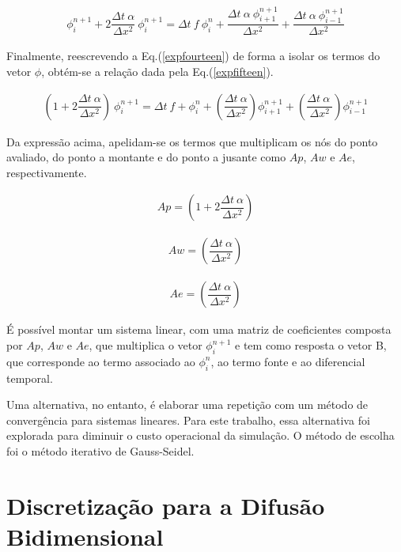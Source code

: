 \begin{align}
\label{expfourteen}
\phi_{i}^{n+1} + 2 \dfrac{\Delta t \ \alpha}{\Delta x^2} \ \phi_{i}^{n+1} = \Delta t \ f \ \phi_{i}^{n} + \dfrac{\Delta t \ \alpha \ \phi_{i+1}^{n+1}}{\Delta x^2} + \dfrac{\Delta t \ \alpha \ \phi_{i-1}^{n+1}}{\Delta x^2}
\end{align}

	Finalmente, reescrevendo a Eq.(\ref{expfourteen}) de forma a isolar os termos do vetor $\phi$, obtém-se a relação dada pela Eq.(\ref{expfifteen}).
	
\begin{align}
\label{expfifteen}
\left(1 + 2 \dfrac{\Delta t \ \alpha}{\Delta x^2} \right) \ \phi_{i}^{n+1} = \Delta t \ f + \phi_{i}^{n} + \left( \dfrac{\Delta t \ \alpha}{\Delta x^2} \right)  \phi_{i+1}^{n+1} + \left( \dfrac{\Delta t \ \alpha \ }{\Delta x^2} \right) \phi_{i-1}^{n+1} 
\end{align}

	Da expressão acima, apelidam-se os termos que multiplicam os nós do ponto avaliado, do ponto a montante e do ponto a jusante como $Ap$, $Aw$ e $Ae$, respectivamente. 
	
\begin{align}
\label{expsixteen}
Ap =  \left(1 + 2 \dfrac{\Delta t \ \alpha}{\Delta x^2} \right)
\end{align}

\begin{align}
\label{expseventeen}
Aw =  \left( \dfrac{\Delta t \ \alpha}{\Delta x^2} \right)
\end{align}

\begin{align}
\label{expeighteen}
Ae =  \left( \dfrac{\Delta t \ \alpha}{\Delta x^2} \right)
\end{align}

	É possível montar um sistema linear, com uma matriz de coeficientes composta por $Ap$, $Aw$ e $Ae$, que multiplica o vetor $\phi_{i}^{n+1}$ e tem como resposta o vetor B, que corresponde ao termo associado ao $\phi_{i}^{n}$, ao termo fonte e ao diferencial temporal.
	
	Uma alternativa, no entanto, é elaborar uma repetição com um método de convergência para sistemas lineares. Para este trabalho, essa alternativa foi explorada para diminuir o custo operacional da simulação. O método de escolha foi o método iterativo de Gauss-Seidel.

\section{Discretização para a Difusão Bidimensional}

